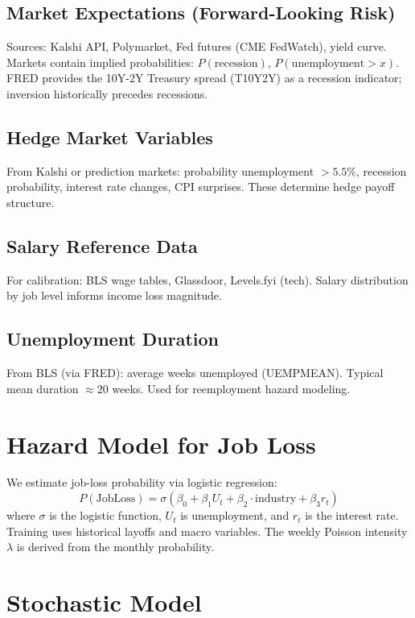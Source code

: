 \documentclass[11pt]{article}
\begin{document}
\subsection{Market Expectations (Forward-Looking Risk)}

Sources: Kalshi API, Polymarket, Fed futures (CME FedWatch), yield curve.
Markets contain implied probabilities: $P(\text{recession})$, 
$P(\text{unemployment} > x)$. FRED provides the 10Y-2Y Treasury spread 
(T10Y2Y) as a recession indicator; inversion historically precedes recessions.

\subsection{Hedge Market Variables}

From Kalshi or prediction markets: probability unemployment $> 5.5\%$, 
recession probability, interest rate changes, CPI surprises. These determine 
hedge payoff structure.

\subsection{Salary Reference Data}

For calibration: BLS wage tables, Glassdoor, Levels.fyi (tech). 
Salary distribution by job level informs income loss magnitude.

\subsection{Unemployment Duration}

From BLS (via FRED): average weeks unemployed (UEMPMEAN). 
Typical mean duration $\approx 20$ weeks. Used for reemployment hazard modeling.

\section{Hazard Model for Job Loss}

We estimate job-loss probability via logistic regression:
\[
P(\text{JobLoss}) = \sigma\left(\beta_0 + \beta_1 U_t + \beta_2 \cdot \text{industry} + \beta_3 r_t\right)
\]
where $\sigma$ is the logistic function, $U_t$ is unemployment, and $r_t$ is the interest rate.
Training uses historical layoffs and macro variables. The weekly Poisson intensity $\lambda$ 
is derived from the monthly probability.

\section{Stochastic Model}
\end{document}
